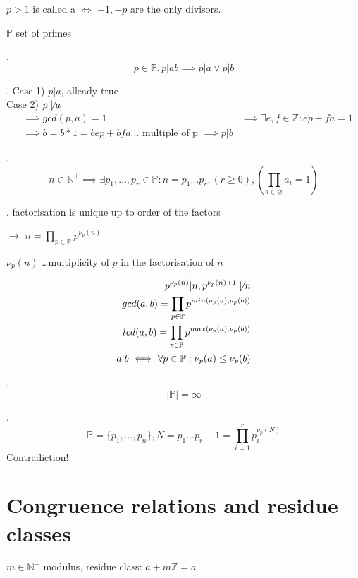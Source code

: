 \begin{definition}
$p>1$ is called a  $\iff$ $\pm 1, \pm p$ are the only divisors.

$\mathbb{P}$ set of primes
\end{definition}

\Theorem.
\[
  p\in \mathbb{P}, p|ab \implies p|a \vee p|b
\]

\Proof.
Case 1) $p|a$, alleady true\\
Case 2) $p \not\mid a$
\begin{align*}
  &\implies gcd(p,a) = 1 
  &\implies \exists e,f \in \mathbb{Z}: ep + fa = 1 \\
  &\implies b = b*1 = b e p + b f a \ldots \text{ multiple of p } \implies p|b
\end{align*}

\Theorem.
\[
  n \in \mathbb{N}^{+} \implies \exists p_1, \ldots ,p_r \in \mathbb{P}: n = p_1 \ldots p_r, (r \geq 0), (\prod_{i\in \varnothing} a_i = 1)
\]

\Remark.
factorisation is unique up to order of the factors

$\rightarrow$ $n = \prod_{p \in \mathbb{P}} p^{\nu_p(n)}$

$\nu_p(n)$ \ldots multiplicity of $p$ in the factorisation of $n$

\begin{align*}
 p^{\nu_p(n)} | n, p^{\nu_p(n)+1} \not\mid n\\
 gcd(a,b) = \prod_{p \in \mathbb{P}} p ^{min(\nu_p(a), \nu_p(b))} \\
 lcd(a,b) = \prod_{p \in \mathbb{P}} p ^{max(\nu_p(a), \nu_p(b))} \\
 a|b \iff \forall p \in \mathbb{P} : \nu_p(a) \leq \nu_p(b)
\end{align*}

\Theorem.
\[
  | \mathbb{P} | = \infty
\]

\Proof.
\[
  \mathbb{P} = \{p_1, \ldots , p_n\}, N = p_1 \ldots p_r + 1 = \prod_{i=1}^r p_i^{\nu_p(N)}
\]
Contradiction!

\section{Congruence relations and residue classes}

\begin{definition}
$m \in \mathbb{N}^{+}$ modulus, 
residue class: $a+m \mathbb{Z} = \overline{a}$ 
\end{definition}

